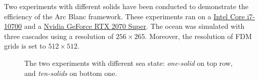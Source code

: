 \documentclass[final]{jcgt}
\def\framework{the Arc Blanc framework\xspace}
\begin{document}
Two experiments with different solids have been conducted to demonstrate the efficiency of \framework.
These experiments ran on a \href{https://www.intel.fr/content/www/fr/fr/products/sku/199316/intel-core-i710700-processor-16m-cache-up-to-4-80-ghz/specifications.html}{Intel Core i7-10700} and a \href{https://www.nvidia.com/fr-fr/geforce/graphics-cards/compare/?section=compare-20}{Nvidia GeForce RTX 2070 Super}.
The ocean was simulated with three cascades using a resolution of $256\times265$.
Moreover, the resolution of FDM grids is set to $512\times 512$.

\begin{figure}[htbp]
	\centering

	\hspace{1cm}
    \vspace{1cm}
	\hspace{1cm}
	\caption{The two experiments with different sea state: \emph{one-solid} on top row, and \emph{ten-solids} on bottom one.}
	\label{fig:experiments}
\end{figure}
\end{document}
